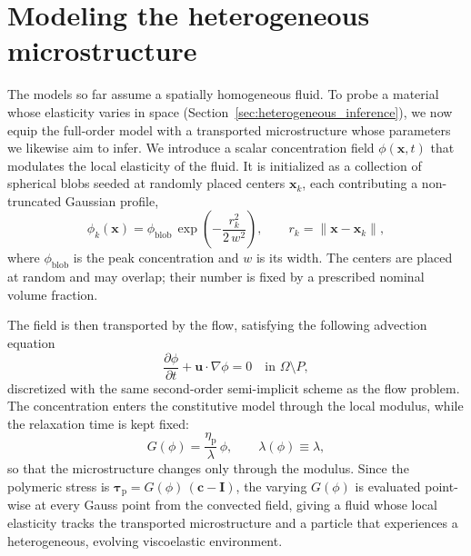 \documentclass{elsarticle}
\renewcommand{\vec}[1]{\boldsymbol{#1}}
\newcommand{\ten}[1]{\boldsymbol{#1}}
\begin{document}
\FloatBarrier

\section{Modeling the heterogeneous microstructure}
\label{sec:blobs}

The models so far assume a spatially homogeneous fluid. To probe a
material whose elasticity varies in space (Section~\ref{sec:heterogeneous_inference}),
we now equip the full-order model with a transported microstructure whose
parameters we likewise aim to infer.
We introduce a scalar concentration field $\phi(\vec{x},t)$ that
modulates the local elasticity of the fluid. It is initialized as a
collection of spherical blobs seeded at randomly placed centers
$\vec{x}_{k}$, each contributing a non-truncated Gaussian profile,
\begin{equation}
\phi_{k}(\vec{x}) = \phi_{\mathrm{blob}}\,
\exp\!\left(-\frac{r_{k}^{2}}{2\,w^{2}}\right),
\qquad r_{k} = \|\vec{x}-\vec{x}_{k}\|,
\label{eq:blob_profile}
\end{equation}
where $\phi_{\mathrm{blob}}$ is the peak concentration and $w$ is its
width. The centers are placed at random and may overlap; their number is
fixed by a prescribed nominal volume fraction.

The field is then transported by the flow, satisfying the following advection equation
\begin{equation}
\frac{\partial \phi}{\partial t} + \vec{u}\cdot\nabla\phi = 0
\quad \text{in } \Omega \setminus P,
\label{eq:phi_advect}
\end{equation}
discretized with the same second-order semi-implicit scheme as the flow
problem. The concentration enters the constitutive model through the local modulus,
while the relaxation time is kept fixed:
\begin{equation}
G(\phi) = \frac{\eta_{\mathrm{p}}}{\lambda}\,\phi,
\qquad \lambda(\phi)\equiv\lambda,
\label{eq:G_of_phi}
\end{equation}
so that the microstructure changes only through the modulus. Since the polymeric
stress is $\ten{\tau}_{\mathrm{p}} = G(\phi)\,(\ten{c}-\ten{I})$, the
varying $G(\phi)$ is evaluated point-wise at every Gauss point from the
convected field, giving a fluid whose local elasticity tracks the
transported microstructure and a particle that experiences a
heterogeneous, evolving viscoelastic environment.



\end{document}
